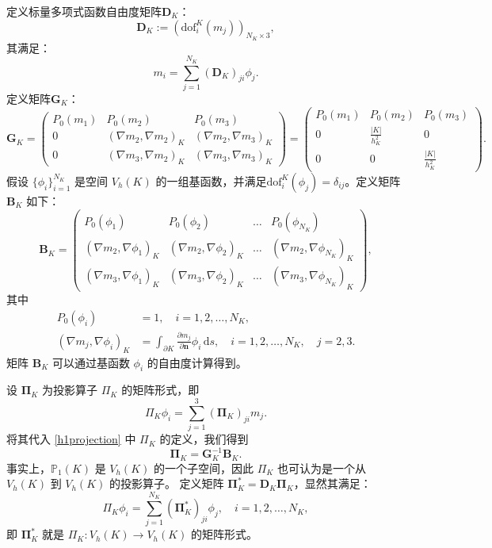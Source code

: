 定义标量多项式函数自由度矩阵$\boldsymbol{D}_K$：
$$
\boldsymbol{D}_K := (\mathrm{dof}_i^K(m_j))_{N_K\times 3},
$$
其满足：
$$
m_i = \sum_{j=1}^{N_K}(\boldsymbol{D}_K)_{ji}\phi_j.
$$
定义矩阵$\boldsymbol{G}_K$：
$$
\boldsymbol{G}_K =
\begin{pmatrix}
    P_0(m_1) & P_0(m_2) & P_0(m_3)\\
    0 & (\nabla m_2, \nabla m_2)_K & (\nabla m_2, \nabla m_3)_K\\
    0 & (\nabla m_3, \nabla m_2)_K & (\nabla m_3, \nabla m_3)_K
\end{pmatrix}
=
\begin{pmatrix}
    P_0(m_1) & P_0(m_2) & P_0(m_3)\\
    0 & \frac{|K|}{h_K^2} & 0\\
    0 & 0 & \frac{|K|}{h_K^2}
\end{pmatrix}.
$$
假设 \(\{\phi_i\}_{i=1}^{N_K}\) 是空间 \(V_h(K)\) 的一组基函数，并满足\( \mathrm{dof}_i^K(\phi_j) = \delta_{ij} \)。定义矩阵 \(\boldsymbol{B}_K\) 如下：
\[
\boldsymbol{B}_K =
\begin{pmatrix}
    P_0(\phi_1) & P_0(\phi_2) & \dots & P_0(\phi_{N_K})\\
    (\nabla m_2, \nabla \phi_1)_K & (\nabla m_2, \nabla \phi_2)_K & \dots & (\nabla m_2, \nabla \phi_{N_K})_K\\
    (\nabla m_3, \nabla \phi_1)_K & (\nabla m_3, \nabla \phi_2)_K & \dots & (\nabla m_3, \nabla \phi_{N_K})_K
\end{pmatrix},
\]
其中
\[
\begin{aligned}
P_0(\phi_i) &= 1, \quad i = 1, 2, \dots, N_K, \\
(\nabla m_j, \nabla \phi_i)_K &= \int_{\partial K} \frac{\partial m_j}{\partial \boldsymbol{n}}\phi_i \,\mathrm{d} s,\quad i = 1, 2, \dots, N_K, \quad j = 2, 3.
\end{aligned}
\]
矩阵 \(\boldsymbol{B}_K\) 可以通过基函数 \(\phi_i\) 的自由度计算得到。

设 \(\boldsymbol{\Pi}_K\) 为投影算子 \(\Pi_K\) 的矩阵形式，即
\[
\Pi_K \phi_i = \sum_{j=1}^{3} (\boldsymbol{\Pi}_K)_{ji} m_j.
\]
将其代入 \ref{h1projection} 中 $\Pi_K$ 的定义，我们得到
$$
\boldsymbol{\Pi}_K = \boldsymbol{G}_K^{-1} \boldsymbol{B}_K.
$$
事实上，$\mathbb{P}_1(K)$ 是 $V_h(K)$ 的一个子空间，因此 $\Pi_K$ 
也可认为是一个从 $V_h(K)$ 到 $V_h(K)$ 的投影算子。
定义矩阵 $\boldsymbol{\Pi}_K^* = \boldsymbol{D}_K \boldsymbol{\Pi}_K$，显然其满足：
$$
\Pi_K \phi_i = \sum_{j=1}^{N_K} (\boldsymbol{\Pi}_K^*)_{ji} \phi_j, \quad i = 1,
2, \dots, N_K,
$$
即 $\boldsymbol{\Pi}_K^*$ 就是 $\Pi_K : V_h(K) \to V_h(K)$ 的矩阵形式。

